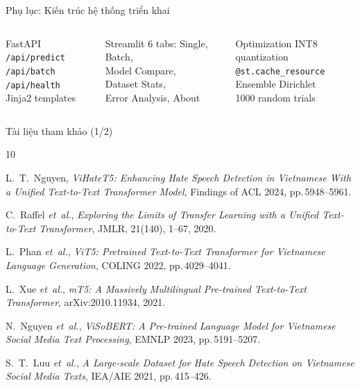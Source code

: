 \documentclass[11pt, aspectratio=169]{beamer}
\begin{document}
\begin{frame}[shrink=8]{Phụ lục: Kiến trúc hệ thống triển khai}
\vspace{0.2cm}
\begin{columns}[T]
  \begin{block}{\centering FastAPI}
    \scriptsize
    \texttt{/api/predict}\\
    \texttt{/api/batch}\\
    \texttt{/api/health}\\
    Jinja2 templates
  \end{block}

  \begin{block}{\centering Streamlit}
    \scriptsize
    6 tabs: Single, Batch,\\
    Model Compare,\\
    Dataset Stats,\\
    Error Analysis, About
  \end{block}

  \begin{block}{\centering Optimization}
    \scriptsize
    INT8 quantization\\
    \texttt{@st.cache\_resource}\\
    Ensemble Dirichlet\\
    1000 random trials
  \end{block}
\end{columns}
\end{frame}


\begin{frame}[shrink=5]{Tài liệu tham khảo (1/2)}
\scriptsize
\begin{thebibliography}{10}

L.~T.~Nguyen,
\textit{ViHateT5: Enhancing Hate Speech Detection in Vietnamese With a Unified Text-to-Text Transformer Model},
Findings of ACL 2024, pp.\,5948--5961.

C.~Raffel \emph{et~al.},
\textit{Exploring the Limits of Transfer Learning with a Unified Text-to-Text Transformer},
JMLR, 21(140), 1--67, 2020.

L.~Phan \emph{et~al.},
\textit{ViT5: Pretrained Text-to-Text Transformer for Vietnamese Language Generation},
COLING 2022, pp.\,4029--4041.

L.~Xue \emph{et~al.},
\textit{mT5: A Massively Multilingual Pre-trained Text-to-Text Transformer},
arXiv:2010.11934, 2021.

N.~Nguyen \emph{et~al.},
\textit{ViSoBERT: A Pre-trained Language Model for Vietnamese Social Media Text Processing},
EMNLP 2023, pp.\,5191--5207.

S.~T.~Luu \emph{et~al.},
\textit{A Large-scale Dataset for Hate Speech Detection on Vietnamese Social Media Texts},
IEA/AIE 2021, pp.\,415--426.

\end{thebibliography}
\end{frame}
\end{document}
